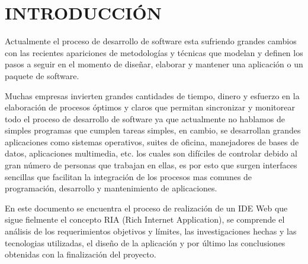 \section{INTRODUCCIÓN}

Actualmente el proceso de desarrollo de software esta sufriendo grandes cambios con las recientes apariciones de metodologías y técnicas que modelan y definen los pasos a seguir en el momento de diseñar, elaborar y mantener una aplicación o un paquete de software.

Muchas empresas invierten grandes cantidades de tiempo, dinero y esfuerzo en la elaboración de procesos óptimos y claros que permitan sincronizar y monitorear todo el proceso de desarrollo de software ya que actualmente no hablamos de simples programas que cumplen tareas simples, en cambio, se desarrollan grandes aplicaciones como sistemas operativos, suites de oficina, manejadores de bases de datos, aplicaciones multimedia, etc. los cuales son difíciles de controlar debido al gran número de personas que trabajan en ellas, es por esto que surgen interfaces sencillas que facilitan la integración de los procesos mas comunes de programación, desarrollo y mantenimiento de aplicaciones.

En este documento se encuentra el proceso de realización de un IDE Web que sigue fielmente el concepto RIA (Rich Internet Application), se comprende el análisis de los requerimientos objetivos y límites, las investigaciones hechas y las tecnologias utilizadas, el diseño de la aplicación y por último las conclusiones obtenidas con la finalización del proyecto.
